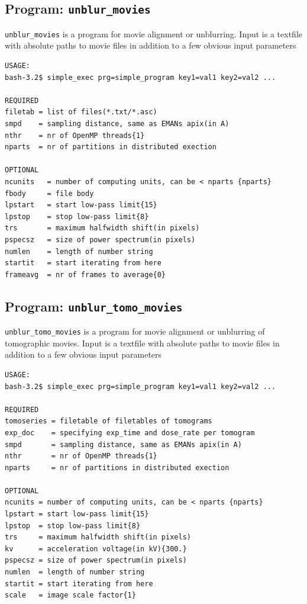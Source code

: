 \documentclass[a4paper,11pt]{article}
\newcommand{\prgname}[1]{\textcolor{NavyBlue}{\texttt{#1}}}
\begin{document}
\subsection{Program: \prgname{unblur\_movies}}
\label{unblur_movies}
\prgname{unblur\_movies} is a program for movie alignment or unblurring. Input is a textfile with absolute paths to movie files in addition to a few obvious input parameters

\begin{verbatim}
USAGE:
bash-3.2$ simple_exec prg=simple_program key1=val1 key2=val2 ...

REQUIRED
filetab = list of files(*.txt/*.asc)
smpd    = sampling distance, same as EMANs apix(in A)
nthr    = nr of OpenMP threads{1}
nparts  = nr of partitions in distributed exection

OPTIONAL
ncunits   = number of computing units, can be < nparts {nparts}
fbody     = file body
lpstart   = start low-pass limit{15}
lpstop    = stop low-pass limit{8}
trs       = maximum halfwidth shift(in pixels)
pspecsz   = size of power spectrum(in pixels)
numlen    = length of number string
startit   = start iterating from here
frameavg  = nr of frames to average{0}
\end{verbatim}

\subsection{Program: \prgname{unblur\_tomo\_movies}}
\label{unblur_tomo_movies}
\prgname{unblur\_tomo\_movies} is a program for movie alignment or unblurring of tomographic movies. Input is a textfile with absolute paths to movie files in addition to a few obvious input parameters

\begin{verbatim}
USAGE:
bash-3.2$ simple_exec prg=simple_program key1=val1 key2=val2 ...

REQUIRED
tomoseries = filetable of filetables of tomograms
exp_doc    = specifying exp_time and dose_rate per tomogram
smpd       = sampling distance, same as EMANs apix(in A)
nthr       = nr of OpenMP threads{1}
nparts     = nr of partitions in distributed exection

OPTIONAL
ncunits = number of computing units, can be < nparts {nparts}
lpstart = start low-pass limit{15}
lpstop  = stop low-pass limit{8}
trs     = maximum halfwidth shift(in pixels)
kv      = acceleration voltage(in kV){300.}
pspecsz = size of power spectrum(in pixels)
numlen  = length of number string
startit = start iterating from here
scale   = image scale factor{1}
\end{verbatim}



\end{document}
